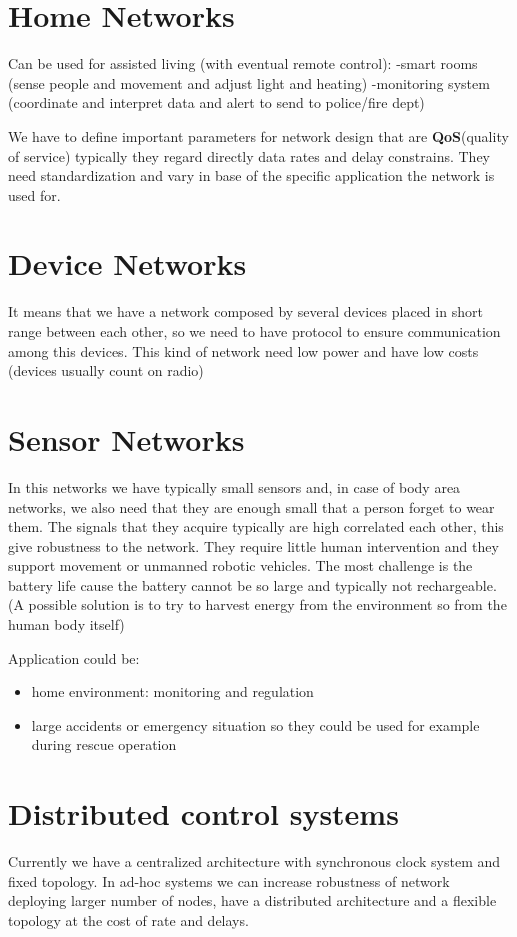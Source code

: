 \section{Home Networks}
Can be used for assisted living (with eventual remote control):
-smart rooms  (sense people and movement and adjust light and heating)
-monitoring system (coordinate and interpret data and alert to send to police/fire dept)

We have to define important parameters for network design that are \textbf{QoS}(quality of service) typically they regard directly data rates and delay constrains. They need standardization and vary in base of the specific application the network is used for. 

\section{Device Networks}
It means that we have a network composed by several devices placed in short range between each other, so we need to have protocol to ensure communication among this devices. This kind of network need low power and have low costs (devices usually count on radio)

\section{Sensor Networks}
In this networks we have typically small sensors and, in case of body area networks, we also need that they are enough small that a person forget to wear them. 
The signals that they acquire typically are high correlated each other, this give robustness to the network. 
They require little human intervention and they support movement or unmanned robotic vehicles. The most challenge is the battery life cause the battery cannot be so large and typically not rechargeable. (A possible solution is to try to harvest energy from the environment so from the human body itself)

Application could be:
\begin{itemize}
\item home environment: monitoring and regulation
\item large accidents or emergency situation so they could be used for example during rescue operation
\end{itemize}

\section{Distributed control systems}
Currently we have a centralized architecture with synchronous clock system and fixed topology. In ad-hoc systems we can increase robustness of network deploying larger number of nodes, have a distributed architecture and a flexible topology at the cost of rate and delays.

